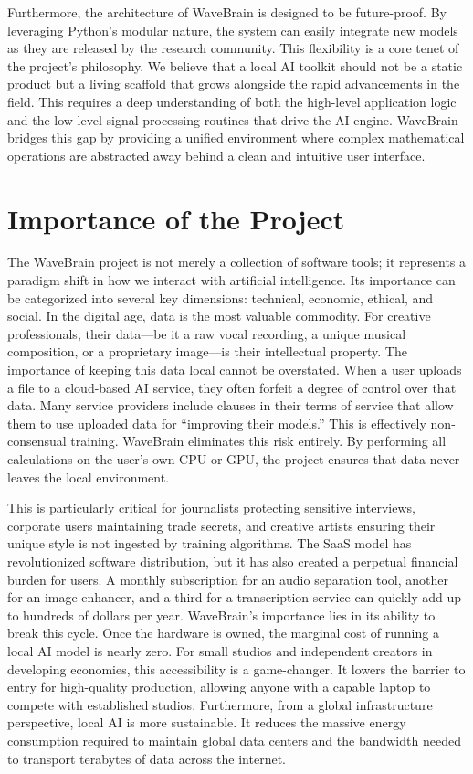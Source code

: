 \documentclass[12pt,a4paper]{article}
\begin{document}
Furthermore, the architecture of WaveBrain is designed to be future-proof. By leveraging Python's modular nature, the system can easily integrate new models as they are released by the research community. This flexibility is a core tenet of the project's philosophy. We believe that a local AI toolkit should not be a static product but a living scaffold that grows alongside the rapid advancements in the field. This requires a deep understanding of both the high-level application logic and the low-level signal processing routines that drive the AI engine. WaveBrain bridges this gap by providing a unified environment where complex mathematical operations are abstracted away behind a clean and intuitive user interface.

\newpage

\section{Importance of the Project}
The WaveBrain project is not merely a collection of software tools; it represents a paradigm shift in how we interact with artificial intelligence. Its importance can be categorized into several key dimensions: technical, economic, ethical, and social. In the digital age, data is the most valuable commodity. For creative professionals, their data---be it a raw vocal recording, a unique musical composition, or a proprietary image---is their intellectual property. The importance of keeping this data local cannot be overstated. When a user uploads a file to a cloud-based AI service, they often forfeit a degree of control over that data. Many service providers include clauses in their terms of service that allow them to use uploaded data for ``improving their models.'' This is effectively non-consensual training. WaveBrain eliminates this risk entirely. By performing all calculations on the user's own CPU or GPU, the project ensures that data never leaves the local environment.

This is particularly critical for journalists protecting sensitive interviews, corporate users maintaining trade secrets, and creative artists ensuring their unique style is not ingested by training algorithms. The SaaS model has revolutionized software distribution, but it has also created a perpetual financial burden for users. A monthly subscription for an audio separation tool, another for an image enhancer, and a third for a transcription service can quickly add up to hundreds of dollars per year. WaveBrain's importance lies in its ability to break this cycle. Once the hardware is owned, the marginal cost of running a local AI model is nearly zero. For small studios and independent creators in developing economies, this accessibility is a game-changer. It lowers the barrier to entry for high-quality production, allowing anyone with a capable laptop to compete with established studios. Furthermore, from a global infrastructure perspective, local AI is more sustainable. It reduces the massive energy consumption required to maintain global data centers and the bandwidth needed to transport terabytes of data across the internet.
\end{document}
